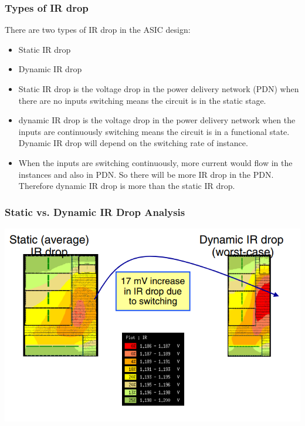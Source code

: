 \documentclass{beamer}
\begin{document}
	\begin{frame}
		\frametitle{Types of IR drop}
		\begin{block}{There are two types of IR drop in the ASIC design:}
			\begin{itemize}
				\item Static IR drop
				\item Dynamic IR drop
			\end{itemize}
		\end{block}
	\begin{itemize}
		\item Static IR drop is the voltage drop in the power delivery network (PDN) when there are no inputs switching means the circuit is in the static stage. 
		\item dynamic IR drop is the voltage drop in the power delivery network when the inputs are continuously switching means the circuit is in a functional state. Dynamic IR drop will depend on the switching rate of instance.
		\item When the inputs are switching continuously, more current would flow in the instances and also in PDN. So there will be more IR drop in the PDN. Therefore dynamic IR drop is more than the static IR drop.
	\end{itemize}		
	\end{frame}
	\begin{frame}
		\frametitle{Static vs. Dynamic IR Drop Analysis}
		\begin{center}
			\includegraphics[width=\textwidth]{IR4_}
		\end{center}
		
	\end{frame}
\end{document}
